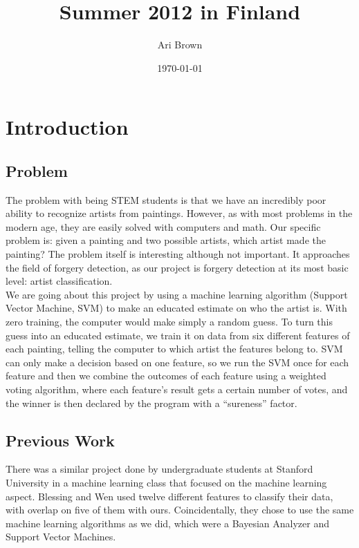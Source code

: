 \documentclass[twocolumn]{article}
\title{Summer 2012 in Finland}
\author{Ari Brown}
\date{\today}
\begin{document}
  \maketitle

  \section{Introduction}
  \subsection{Problem}
  The problem with being STEM students is that we have an incredibly poor ability
  to recognize artists from paintings. However, as with most problems in the
  modern age, they are easily solved with computers and math. Our specific problem
  is: given a painting and two possible artists, which artist made the painting?
  The problem itself is interesting although not important. It approaches the
  field of forgery detection, as our project is forgery detection at its most
  basic level: artist classification. \\
  
  We are going about this project by using a machine learning algorithm (Support
  Vector Machine, SVM) to make an educated estimate on who the artist is. With
  zero training, the computer would make simply a random guess. To turn this guess
  into an educated estimate, we train it on data from six different features of
  each painting, telling the computer to which artist the features belong to.
  SVM can only make a decision based on one feature, so we run the SVM once for
  each feature and then we combine the outcomes of each feature using a weighted
  voting algorithm, where each feature's result gets a certain number of votes,
  and the winner is then declared by the program with a ``sureness'' factor.

  \subsection{Previous Work}
  There was a similar project done by undergraduate students at Stanford
  University in a machine learning class that focused on the machine learning
  aspect. Blessing and Wen used twelve different features to classify their
  data, with overlap on five of them with ours. Coincidentally, they chose to
  use the same machine learning algorithms as we did, which were a Bayesian
  Analyzer and Support Vector Machines. \\
  
\end{document}

